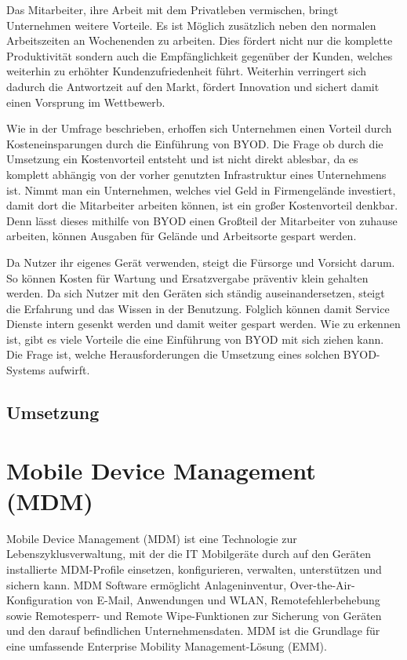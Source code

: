Das Mitarbeiter, ihre Arbeit mit dem Privatleben vermischen, bringt Unternehmen weitere Vorteile. Es ist Möglich zusätzlich neben den normalen Arbeitszeiten an Wochenenden zu arbeiten. Dies fördert nicht nur die komplette Produktivität sondern auch die Empfänglichkeit gegenüber der Kunden, welches weiterhin zu erhöhter Kundenzufriedenheit führt. Weiterhin verringert sich dadurch die Antwortzeit auf den Markt, fördert Innovation und sichert damit einen Vorsprung im Wettbewerb.

Wie in der Umfrage beschrieben, erhoffen sich Unternehmen einen Vorteil durch Kosteneinsparungen durch die Einführung von BYOD. Die Frage ob durch die Umsetzung ein Kostenvorteil entsteht und ist nicht direkt ablesbar, da es komplett abhängig von der vorher genutzten Infrastruktur eines Unternehmens ist. Nimmt man ein Unternehmen, welches viel Geld in Firmengelände investiert, damit dort die Mitarbeiter arbeiten können, ist ein großer Kostenvorteil denkbar. Denn lässt dieses mithilfe von BYOD einen Großteil der Mitarbeiter von zuhause arbeiten, können Ausgaben für Gelände und Arbeitsorte gespart werden. 

Da Nutzer ihr eigenes Gerät verwenden, steigt die Fürsorge und Vorsicht darum. So können Kosten für Wartung und Ersatzvergabe präventiv klein gehalten werden. Da sich Nutzer mit den Geräten sich ständig auseinandersetzen, steigt die Erfahrung und das Wissen in der Benutzung. Folglich können damit Service Dienste intern gesenkt werden und damit weiter gespart werden.
Wie zu erkennen ist, gibt es viele Vorteile die eine Einführung von BYOD mit sich ziehen kann. Die Frage ist, welche Herausforderungen die Umsetzung eines solchen BYOD-Systems aufwirft.

\subsection{Umsetzung}











\section{Mobile Device Management (MDM)}
Mobile Device Management (MDM) ist eine Technologie zur Lebenszyklusverwaltung, mit der die IT Mobilgeräte durch auf den Geräten installierte MDM-Profile einsetzen, konfigurieren, verwalten, unterstützen und sichern kann. MDM Software ermöglicht Anlageninventur, Over-the-Air-Konfiguration von E-Mail, Anwendungen und WLAN, Remotefehlerbehebung sowie Remotesperr- und Remote Wipe-Funktionen zur Sicherung von Geräten und den darauf befindlichen Unternehmensdaten. MDM ist die Grundlage für eine umfassende Enterprise Mobility Management-Lösung (EMM). 

